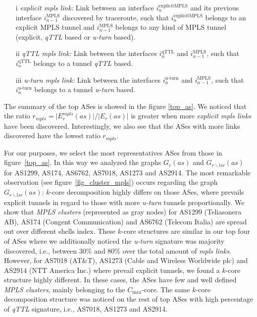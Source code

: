 \begin{itemize}
\item[i] \textit{explicit mpls link:} Link between an interface $i^{\text{explicitMPLS}}_{n}$  and its previous interface $i^{\text{MPLS}}_{n-1}$ discovered by traceroute, such that $i^{\text{explicitMPLS}}_{n}$ belongs to an explicit MPLS tunnel and $i^{\text{MPLS}}_{n-1}$ belongs to any kind of MPLS tunnel (explicit, \textit{qTTL} based or \textit{u-turn} based).

\item[ii] \textit{qTTL mpls link:} Link between the interfaces $i^{\text{qTTL}}_{n}$  and $i^{\text{MPLS}}_{n-1}$, such that $i^{\text{qTTL}}_{n}$ belongs to a tunnel \textit{qTTL} based.

\item[iii] \textit{u-turn mpls link:} Link between the interfaces $i^{\text{u-turn}}_{n}$  and $i^{\text{MPLS}}_{n-1}$, such that $i^{\text{u-turn}}_{n}$ belongs to a tunnel \textit{u-turn} based.

\end{itemize}

The summary of the top ASes is showed in the figure \ref{top_as}. 
We noticed that the ratio $r_{mpls}= \vert E^{mpls}_{r} (as) \vert /\vert E_{r} (as) \vert $  is greater when more  \textit{explicit mpls links} have been discovered. 
Interestingly, we also see that the ASes with more links discovered have the lowest ratio $r_{mpls}$. 

For our purposes, we select the most representatives ASes from those in figure~\ref{top_as}.
In this way we analyzed the graphs $G_{r}(as)$ and $G_{r\backslash lsr}(as)$ for AS1299, AS174, AS6762, AS7018, AS1273 and AS2914. 
The most remarkable observation (see figure~\ref{fig_cluster_mpls}) occurs regarding the graph $G_{r\backslash lsr}(as)$: $k$-core decomposition highly differs on those ASes, where prevails explicit tunnels in regard to those with more \textit{u-turn} tunnels proportionally. 
We show that \textit{MPLS clusters} (represented as gray nodes) for  AS1299 (Teliasonera AB), AS174 (Congent Communication) and AS6762 (Telecom Italia) are spread out over different shells index. 
These $k$-core structures are similar in our top four of ASes where we additionally noticed  the \textit{u-turn} signature was majority discovered, i.e., between $30\%$ and  $80\%$ over  the total amount of \textit{mpls links}. 
However, for AS7018 (AT\&T), AS1273 (Cable and Wireless Worldwide plc) and AS2914 (NTT America Inc.) %
 where prevail explicit tunnels, we found a $k$-core structure highly different.  
In these cases,  the ASes have few and well defined \textit{MPLS clusters}, mainly belonging to the $C_{\max}$-core. 
The same $k$-core decomposition structure was noticed  on the rest of top ASes with high percentage of \textit{qTTL} signature, i.e., AS7018, AS1273 and AS2914.

